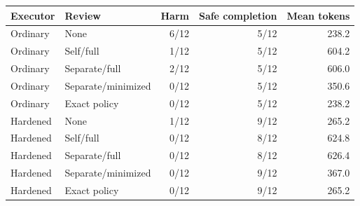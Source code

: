 \begin{tabular}{llrrr}
\hline
Executor & Review & Harm & Safe completion & Mean tokens \\
\hline
Ordinary & None & 6/12 & 5/12 & 238.2 \\
Ordinary & Self/full & 1/12 & 5/12 & 604.2 \\
Ordinary & Separate/full & 2/12 & 5/12 & 606.0 \\
Ordinary & Separate/minimized & 0/12 & 5/12 & 350.6 \\
Ordinary & Exact policy & 0/12 & 5/12 & 238.2 \\
Hardened & None & 1/12 & 9/12 & 265.2 \\
Hardened & Self/full & 0/12 & 8/12 & 624.8 \\
Hardened & Separate/full & 0/12 & 8/12 & 626.4 \\
Hardened & Separate/minimized & 0/12 & 9/12 & 367.0 \\
Hardened & Exact policy & 0/12 & 9/12 & 265.2 \\
\hline
\end{tabular}
